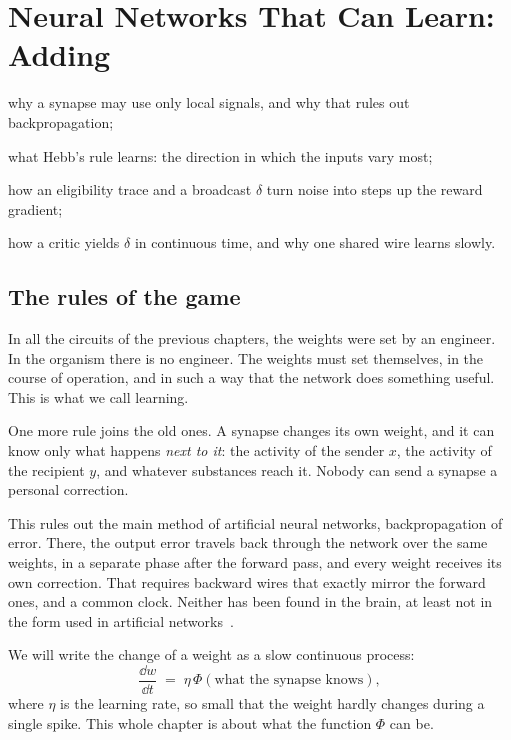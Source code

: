 \chapter{Neural Networks That Can Learn: Adding }
\label{sec:dofa}
\begin{chaptergoals}
\item why a synapse may use only local signals, and why that rules out backpropagation;
\item what Hebb's rule learns: the direction in which the inputs vary most;
\item how an eligibility trace and a broadcast $\delta$ turn noise into steps up the reward gradient;
\item how a critic yields $\delta$ in continuous time, and why one shared wire learns slowly.
\end{chaptergoals}

\section{The rules of the game}

In all the circuits of the previous chapters, the weights were set by an engineer. In the organism there is no engineer. The weights must set themselves, in the course of operation, and in such a way that the network does something useful. This is what we call learning.

One more rule joins the old ones. A synapse changes its own weight, and it can know only what happens \emph{next to it}: the activity of the sender $x$, the activity of the recipient $y$, and whatever substances reach it. Nobody can send a synapse a personal correction.

This rules out the main method of artificial neural networks, backpropagation of error. There, the output error travels back through the network over the same weights, in a separate phase after the forward pass, and every weight receives its own correction. That requires backward wires that exactly mirror the forward ones, and a common clock. Neither has been found in the brain, at least not in the form used in artificial networks~\cite{Lillicrap2020,WhittingtonBogacz2019}.

We will write the change of a weight as a slow continuous process:
\begin{equation}
\frac{\dd w}{\dd t} \;=\; \eta\,\Phi(\text{what the synapse knows}),
\label{eq:plasticity}
\end{equation}
where $\eta$ is the learning rate, so small that the weight hardly changes during a single spike. This whole chapter is about what the function $\Phi$ can be.


